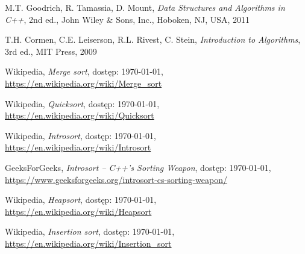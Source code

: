 \documentclass[polish,a4paper]{article}
\begin{document}
\renewcommand{\refname}{Źródła}
\begin{thebibliography}{11}
	M.T. Goodrich, R. Tamassia, D. Mount, \textit{Data Structures and Algorithms in C++}, 2nd ed., John Wiley \& Sons, Inc., Hoboken, NJ, USA, 2011
	
    T.H. Cormen, C.E. Leiserson, R.L. Rivest, C. Stein, \textit{Introduction to Algorithms}, 3rd ed., MIT Press, 2009

    Wikipedia, \textit{Merge sort}, dostęp: {\today},\\
    \url{https://en.wikipedia.org/wiki/Merge_sort}
    
    Wikipedia, \textit{Quicksort}, dostęp: {\today},\\
    \url{https://en.wikipedia.org/wiki/Quicksort}
    
    Wikipedia, \textit{Introsort}, dostęp: {\today},\\
    \url{https://en.wikipedia.org/wiki/Introsort}
    
    GeeksForGeeks, \textit{Introsort – C++’s Sorting Weapon}, dostęp: {\today},\\
    \url{https://www.geeksforgeeks.org/introsort-cs-sorting-weapon/}
    
    Wikipedia, \textit{Heapsort}, dostęp: {\today},\\
    \url{https://en.wikipedia.org/wiki/Heapsort}
    
    Wikipedia, \textit{Insertion sort}, dostęp: {\today},\\
    \url{https://en.wikipedia.org/wiki/Insertion_sort}
\end{thebibliography}
\end{document}
